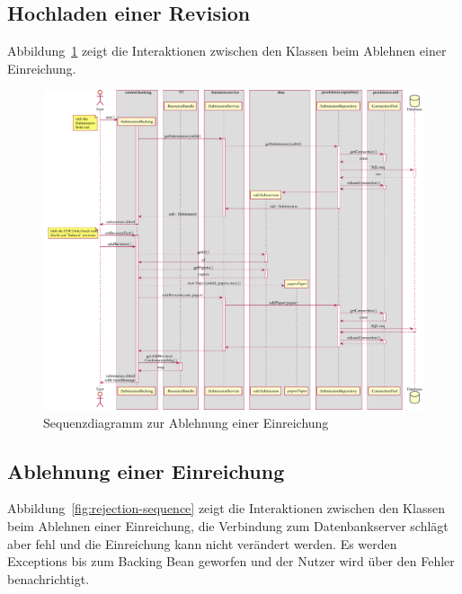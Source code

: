 
\subsection{Hochladen einer Revision}\label{subsec:sequenz-revision-hochladen}

Abbildung~\ref{fig:upload-revision-sequence} zeigt die Interaktionen zwischen den Klassen beim Ablehnen einer Einreichung.

\begin{figure}
    \centering
    \includegraphics[width=\textwidth]{graphics/upload_revision}
    \caption{Sequenzdiagramm zur Ablehnung einer Einreichung}
    \label{fig:upload-revision-sequence}
\end{figure}

\subsection{Ablehnung einer Einreichung}\label{subsec:sequenz-ablehnung}

Abbildung~\ref{fig:rejection-sequence} zeigt die Interaktionen zwischen den Klassen beim Ablehnen einer Einreichung, die Verbindung zum Datenbankserver schlägt aber fehl und die Einreichung kann nicht verändert werden. Es werden Exceptions bis zum Backing Bean geworfen und der Nutzer wird über den Fehler benachrichtigt.

